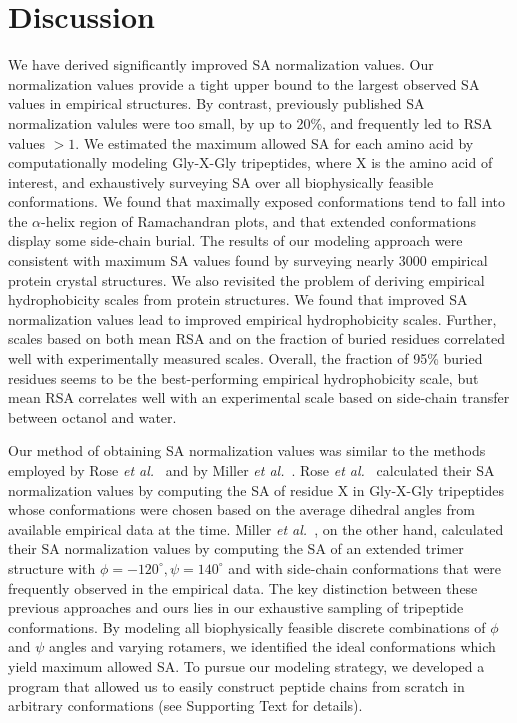 \documentclass[11pt]{article}
\begin{document}
\section*{Discussion}

We have derived significantly improved SA normalization values. Our normalization values provide a tight upper bound to the largest observed SA values in empirical structures. By contrast, previously published SA normalization valules were too small, by up to 20\%, and frequently led to RSA values $>1$. We estimated the maximum allowed SA for each amino acid by computationally modeling Gly-X-Gly tripeptides, where X is the amino acid of interest, and exhaustively surveying SA over all biophysically feasible conformations. We found that maximally exposed conformations tend to fall into the $\alpha$-helix region of Ramachandran plots, and that extended conformations display some side-chain burial. The results of our modeling approach were consistent with maximum SA values found by surveying nearly 3000 empirical protein crystal structures. We also revisited the problem of deriving empirical hydrophobicity scales from protein structures. We found that improved SA normalization values lead to improved empirical hydrophobicity scales. Further, scales based on both mean RSA and on the fraction of buried residues correlated well with experimentally measured scales. Overall, the fraction of 95\% buried residues seems to be the best-performing empirical hydrophobicity scale, but mean RSA correlates well with an experimental scale based on side-chain transfer between octanol and water.

Our method of obtaining SA normalization values was similar to the methods employed by Rose \emph{et al.}~\cite{Rose1985} and by Miller \emph{et al.}~\cite{Miller1987}. Rose \emph{et al.}~\cite{Rose1985} calculated their SA normalization values by computing the SA of residue X in Gly-X-Gly tripeptides whose conformations were chosen based on the average dihedral angles from available empirical data at the time. Miller \emph{et al.}~\cite{Miller1987}, on the other hand, calculated their SA normalization values by computing the SA of an extended trimer structure with $\phi = -120^\circ, \psi= 140^\circ$ and with side-chain conformations that were frequently observed in the empirical data. The key distinction between these previous approaches and ours lies in our exhaustive sampling of tripeptide conformations. By modeling all biophysically feasible discrete combinations of $\phi$ and $\psi$ angles and varying rotamers, we identified the ideal conformations which yield maximum allowed SA. To pursue our modeling strategy, we developed a program that allowed us to easily construct peptide chains from scratch in arbitrary conformations (see Supporting Text for details).
\end{document}
